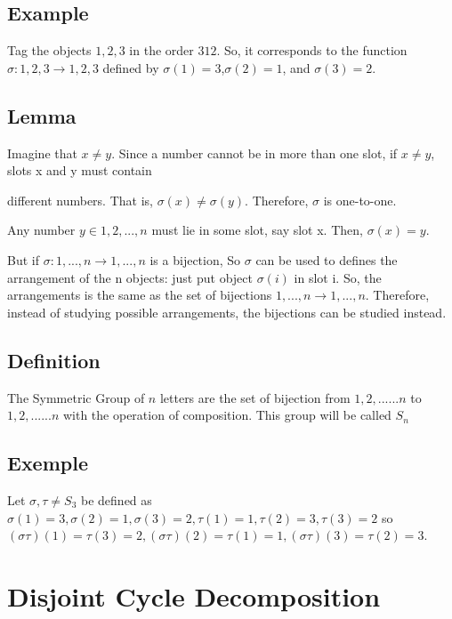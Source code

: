 \subsection{Example} 
Tag the objects $1, 2, 3$ in the order $3 1 2$. So, it corresponds to the function $\sigma: {1, 2, 3} \rightarrow {1, 2, 3}$
defined by $\sigma(1) = 3$,$\sigma(2) = 1$, and $\sigma(3) = 2$.

\subsection{Lemma}

Imagine that $x\neq y$. Since a number cannot be in more than one slot, if $x \neq y$, slots x and y must contain

different numbers. That is, $\sigma(x) \neq \sigma(y)$. Therefore, $\sigma$ is one-to-one.

Any number $y \in {1, 2, . . . , n}$ must lie in some slot, say slot x. Then, $\sigma(x) = y$.

But if $\sigma: {1, . . . , n} \rightarrow {1, . . . , n}$ is a bijection, So $\sigma$ can be used to defines the arrangement of the n
objects: just put object $\sigma(i)$ in slot i. So, the arrangements is the same as the set of
bijections ${1, . . . , n} \rightarrow {1, . . . , n}$. Therefore, instead of studying possible arrangements, the bijections can be studied instead.

\subsection{Definition}

The Symmetric Group of $n$ letters are the set of bijection from ${1,2,......n}$ to ${1,2,......n}$ with the operation of composition. This group will be called $S_n$

\subsection{Exemple}

Let $\sigma,\tau \neq S_3$ be defined as $\sigma(1)=3, \sigma(2)=1, \sigma(3)=2, \tau(1)=1,\tau(2)=3,\tau(3)=2$ so $(\sigma\tau)(1)=\tau(3)=2,(\sigma\tau)(2)=\tau(1)=1, (\sigma\tau)(3)=\tau(2)=3.$

\section{Disjoint Cycle Decomposition}

